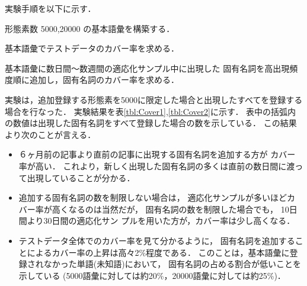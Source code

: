 実験手順を以下に示す．

\begin{description}
\vspace{-1mm}
 \item[Step.1] 形態素数 5000,20000 の基本語彙を構築する．
\vspace{-1mm}
 \item[Step.2] 基本語彙でテストデータのカバー率を求める．
\vspace{-1mm}
 \item[Step.3] 基本語彙に数日間〜数週間の適応化サンプル中に出現した
固有名詞を高出現頻度順に追加し，固有名詞のカバー率を求める．
\end{description}

実験は，追加登録する形態素を5000に限定した場合と出現したすべてを登録する
場合を行なった．
実験結果を表\ref{tbl:Cover1},\ref{tbl:Cover2}に示す．
\mbox{表中の括弧内の数値は出現した固有名詞をすべて登録した場}合の数を示している．
この結果より次のことが言える．
\begin{itemize}
\item ６ヶ月前の記事より直前の記事に出現する固有名詞を追加する方が
      カバー率が高い．
      これより，新しく出現した固有名詞の多くは直前の数日間に渡って出現していることが分かる．
\item 追加する固有名詞の数を制限しない場合は，
      適応化サンプルが多いほどカバー率が高くなるのは当然だが，
      固有名詞の数を制限した場合でも，
      10日間より30日間の適応化サン\break
      プルを用いた方が，カバー率は少し高くなる．
\item テストデータ全体でのカバー率を見て分かるように，
      固有名詞を追加することによるカバー率の上昇は高々2\%程度である．
      このことは，基本語彙に登録されなかった単語(未知語)において，
      固有名詞の占める割合が低いことを示している
      (5000語彙に対しては約20\%，20000語彙に対しては約25\%)．
\end{itemize}

